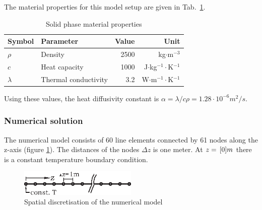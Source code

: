 The material properties for this model setup are given in Tab.~\ref{tab-ldhp}.

\begin{table}[h]%
\caption{\label{tab-ldhp}Solid phase material properties}
\begin{center}
\begin{tabular}{llrr}
\toprule
Symbol & Parameter & Value & Unit \\
\midrule
$\rho$ & Density & 2500 & kg$\cdot$m$^{-3}$ \\			
$c$	   & Heat capacity & 1000 & J$\cdot$kg$^{-1}\cdot$K$^{-1}$ \\
$\lambda$	& Thermal conductivity & 3.2 & W$\cdot$m$^{-1}\cdot$K$^{-1}$ \\
\bottomrule
\end{tabular}
\end{center}
\end{table}

Using these values, the heat diffusivity constant is $\alpha = \lambda/c\rho = 1.28 \cdot 10^{-6}m^2/s$.

\subsubsection{Numerical solution}

The numerical model consists of 60 line elements connected by 61 nodes along the z-axis (figure \ref{fig-ms-lhd}). The distances of the nodes $\Delta z$ is one meter. At $z=\, \mathrm{[}0]{m}$ there is a constant temperature boundary condition. 

\begin{figure}%
\centering
\includegraphics[width=0.5\textwidth]{PART_II/T/ms-lhd.eps}
\caption{\label{fig-ms-lhd}Spatial discretisation of the numerical model}
\end{figure}

